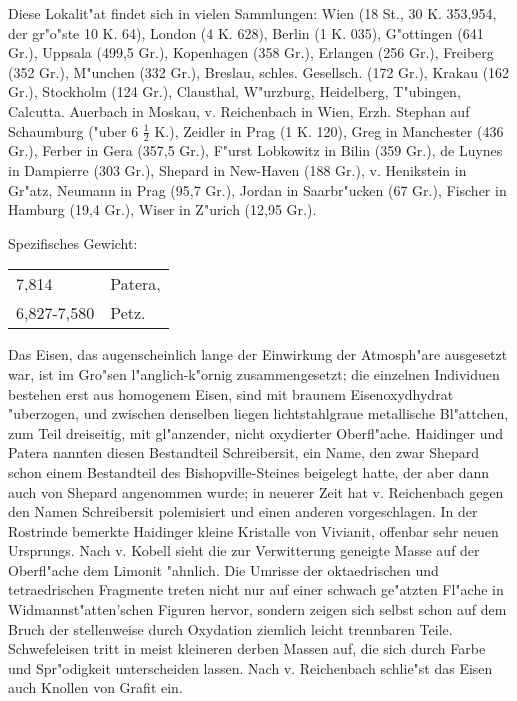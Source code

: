 \documentclass[a4paper, 11pt, oneside]{article}
\begin{document}
Diese Lokalit"at findet sich in vielen Sammlungen: Wien (18 St., 30 K. 353,954, der gr"o"ste 10 K. 64), London (4 K. 628), Berlin (1 K. 035), G"ottingen (641 Gr.), Uppsala (499,5 Gr.), Kopenhagen (358 Gr.), Erlangen (256 Gr.), Freiberg (352 Gr.), M"unchen (332 Gr.), Breslau, schles. Gesellsch. (172 Gr.), Krakau (162 Gr.), Stockholm (124 Gr.), Clausthal, W"urzburg, Heidelberg, T"ubingen, Calcutta. Auerbach in Moskau, v. Reichenbach in Wien, Erzh. Stephan auf Schaumburg ("uber 6 $\mathfrak{\frac{1}{2}}$ K.), Zeidler in Prag (1 K. 120), Greg in Manchester (436 Gr.), Ferber in Gera (357,5 Gr.), F"urst Lobkowitz in Bilin (359 Gr.), de Luynes in Dampierre (303 Gr.), Shepard in New-Haven (188 Gr.), v. Henikstein in Gr"atz, Neumann in Prag (95,7 Gr.), Jordan in Saarbr"ucken (67 Gr.), Fischer in Hamburg (19,4 Gr.), Wiser in Z"urich (12,95 Gr.).

Spezifisches Gewicht:  
\begin{table}[!ht]
    \centering\swabfamily\Large
    \begin{tabular}{l l}
        7,814 & Patera,\\
        6,827-7,580 & Petz.
    \end{tabular}
\end{table}

Das Eisen, das augenscheinlich lange der Einwirkung der Atmosph"are ausgesetzt war, ist im Gro"sen l"anglich-k"ornig zusammengesetzt; die einzelnen Individuen bestehen erst aus homogenem Eisen, sind mit braunem Eisenoxydhydrat "uberzogen, und zwischen denselben liegen lichtstahlgraue metallische Bl"attchen, zum Teil dreiseitig, mit gl"anzender, nicht oxydierter Oberfl"ache. Haidinger und Patera nannten diesen Bestandteil Schreibersit, ein Name, den zwar Shepard schon einem Bestandteil des Bishopville-Steines beigelegt hatte, der aber dann auch von Shepard angenommen wurde; in neuerer Zeit hat v. Reichenbach gegen den Namen Schreibersit polemisiert und einen anderen vorgeschlagen. In der Rostrinde bemerkte Haidinger kleine Kristalle von Vivianit, offenbar sehr neuen Ursprungs. Nach v. Kobell sieht die zur Verwitterung geneigte Masse auf der Oberfl"ache dem Limonit "ahnlich. Die Umrisse der oktaedrischen und tetraedrischen Fragmente treten nicht nur auf einer schwach ge"atzten Fl"ache in Widmannst"atten'schen Figuren hervor, sondern zeigen sich selbst schon auf dem Bruch der stellenweise durch Oxydation ziemlich leicht trennbaren Teile. Schwefeleisen tritt in meist kleineren derben Massen auf, die sich durch Farbe und Spr"odigkeit unterscheiden lassen. Nach v. Reichenbach schlie"st das Eisen auch Knollen von Grafit ein.
\end{document}
